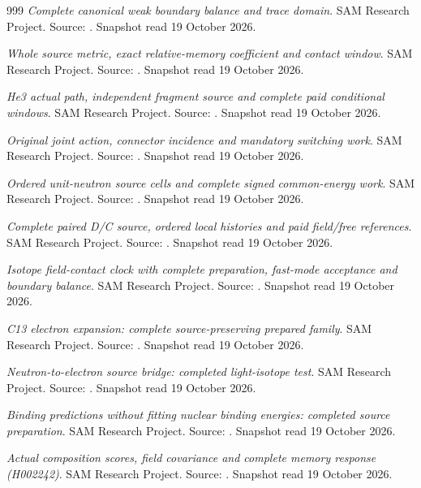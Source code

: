 \begin{thebibliography}{999}
 \emph{Complete canonical weak boundary balance and trace domain}. SAM Research Project. Source: . Snapshot read 19 October 2026.

 \emph{Whole source metric, exact relative-memory coefficient and contact window}. SAM Research Project. Source: . Snapshot read 19 October 2026.

 \emph{He3 actual path, independent fragment source and complete paid conditional windows}. SAM Research Project. Source: . Snapshot read 19 October 2026.

 \emph{Original joint action, connector incidence and mandatory switching work}. SAM Research Project. Source: . Snapshot read 19 October 2026.

 \emph{Ordered unit-neutron source cells and complete signed common-energy work}. SAM Research Project. Source: . Snapshot read 19 October 2026.

 \emph{Complete paired D/C source, ordered local histories and paid field/free references}. SAM Research Project. Source: . Snapshot read 19 October 2026.

 \emph{Isotope field-contact clock with complete preparation, fast-mode acceptance and boundary balance}. SAM Research Project. Source: . Snapshot read 19 October 2026.

 \emph{C13 electron expansion: complete source-preserving prepared family}. SAM Research Project. Source: . Snapshot read 19 October 2026.

 \emph{Neutron-to-electron source bridge: completed light-isotope test}. SAM Research Project. Source: . Snapshot read 19 October 2026.

 \emph{Binding predictions without fitting nuclear binding energies: completed source preparation}. SAM Research Project. Source: . Snapshot read 19 October 2026.

 \emph{Actual composition scores, field covariance and complete memory response (H002242)}. SAM Research Project. Source: . Snapshot read 19 October 2026.


\end{thebibliography}

